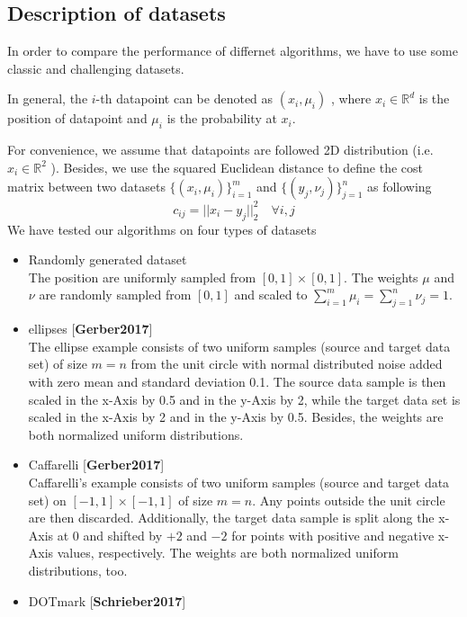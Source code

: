 \documentclass{article}
\begin{document}
\begin{large}
\subsection{Description of datasets}
In order to compare the performance of differnet algorithms, we have to use some classic and challenging datasets.

In general, the $i$-th datapoint can be denoted as $(x_{i},\mu_{i})$ , where $x_{i}\in \mathbb{R}^{d}$ is the position of datapoint and $\mu_{i}$ is the probability at $x_{i}$.

For convenience, we assume that datapoints are followed 2D distribution (i.e. $x_{i}\in \mathbb{R}^{2}$ ). Besides, we use the squared Euclidean distance to define the cost matrix between two datasets $\{(x_{i},\mu_{i})\}_{i=1}^{m}$ and $\{(y_{j},\nu_{j})\}_{j=1}^{n}$ as following
\begin{equation}
  c_{ij}=||x_{i}-y_{j}||_{2}^{2}\quad\forall i, j
\end{equation}
We have tested our algorithms on four types of datasets
\begin{itemize}
  \item Randomly generated dataset\\
        The position are uniformly sampled from
        $[0, 1]\times[0, 1]$. The weights $\mu$ and $\nu$ are randomly sampled from $[0, 1]$ and scaled to $ \sum_{i=1}^{m}{\mu_i} = \sum_{j=1}^{n}{\nu_j} = 1 $.
  \item ellipses [\textbf{Gerber2017}]\\
  The ellipse example consists of two uniform samples (source and target data set) of size $m=n$ from the unit circle
  with normal distributed noise added with zero mean and standard deviation 0.1. The source
  data sample is then scaled in the x-Axis by 0.5 and in the y-Axis by 2, while the target
  data set is scaled in the x-Axis by 2 and in the y-Axis by 0.5.
  Besides, the weights are both normalized uniform distributions.
  \item Caffarelli [\textbf{Gerber2017}]\\
  Caffarelli’s example consists of two uniform samples (source and target data set) on $[-1, 1]\times[-1, 1]$  of size $m=n$. Any points outside the unit circle are then
discarded. Additionally, the target data sample is split along the x-Axis at 0 and shifted by
$+2$ and $-2$ for points with positive and negative x-Axis values, respectively. The weights are both normalized uniform distributions, too.
  \item DOTmark [\textbf{Schrieber2017}]\\

\end{itemize}
\end{large}
\end{document}

